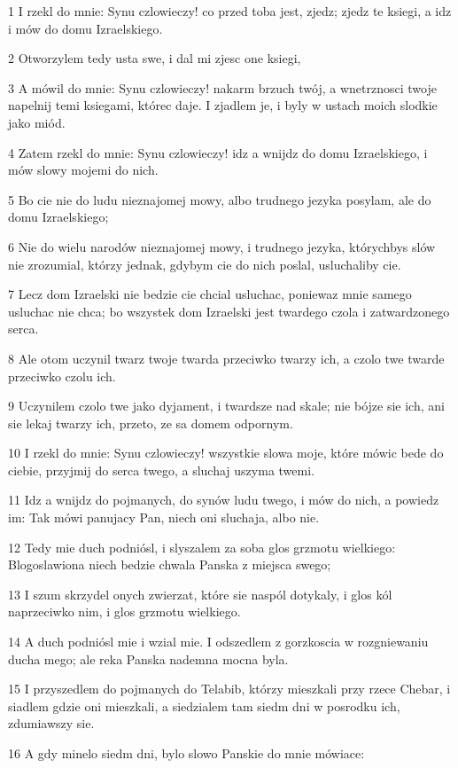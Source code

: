 \par 1 I rzekl do mnie: Synu czlowieczy! co przed toba jest, zjedz; zjedz te ksiegi, a idz i mów do domu Izraelskiego.
\par 2 Otworzylem tedy usta swe, i dal mi zjesc one ksiegi,
\par 3 A mówil do mnie: Synu czlowieczy! nakarm brzuch twój, a wnetrznosci twoje napelnij temi ksiegami, którec daje. I zjadlem je, i byly w ustach moich slodkie jako miód.
\par 4 Zatem rzekl do mnie: Synu czlowieczy! idz a wnijdz do domu Izraelskiego, i mów slowy mojemi do nich.
\par 5 Bo cie nie do ludu nieznajomej mowy, albo trudnego jezyka posylam, ale do domu Izraelskiego;
\par 6 Nie do wielu narodów nieznajomej mowy, i trudnego jezyka, którychbys slów nie zrozumial, którzy jednak, gdybym cie do nich poslal, usluchaliby cie.
\par 7 Lecz dom Izraelski nie bedzie cie chcial usluchac, poniewaz mnie samego usluchac nie chca; bo wszystek dom Izraelski jest twardego czola i zatwardzonego serca.
\par 8 Ale otom uczynil twarz twoje twarda przeciwko twarzy ich, a czolo twe twarde przeciwko czolu ich.
\par 9 Uczynilem czolo twe jako dyjament, i twardsze nad skale; nie bójze sie ich, ani sie lekaj twarzy ich, przeto, ze sa domem odpornym.
\par 10 I rzekl do mnie: Synu czlowieczy! wszystkie slowa moje, które mówic bede do ciebie, przyjmij do serca twego, a sluchaj uszyma twemi.
\par 11 Idz a wnijdz do pojmanych, do synów ludu twego, i mów do nich, a powiedz im: Tak mówi panujacy Pan, niech oni sluchaja, albo nie.
\par 12 Tedy mie duch podniósl, i slyszalem za soba glos grzmotu wielkiego: Blogoslawiona niech bedzie chwala Panska z miejsca swego;
\par 13 I szum skrzydel onych zwierzat, które sie naspól dotykaly, i glos kól naprzeciwko nim, i glos grzmotu wielkiego.
\par 14 A duch podniósl mie i wzial mie. I odszedlem z gorzkoscia w rozgniewaniu ducha mego; ale reka Panska nademna mocna byla.
\par 15 I przyszedlem do pojmanych do Telabib, którzy mieszkali przy rzece Chebar, i siadlem gdzie oni mieszkali, a siedzialem tam siedm dni w posrodku ich, zdumiawszy sie.
\par 16 A gdy minelo siedm dni, bylo slowo Panskie do mnie mówiace:
